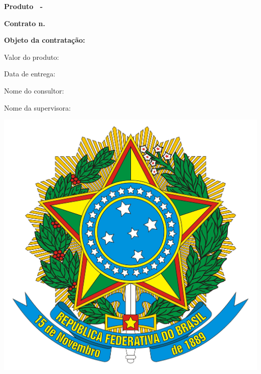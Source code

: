\addtolength{\topmargin}{2.5cm}
\thispagestyle{empty}
{\color{MidnightBlue}

{\bf \LARGE Produto \ProductNumber\ -\ \ProductTitle}

\hrulefill

\vspace{1cm}

\begin{center}

{\bf \large Contrato n. \ContractNumber}

\vspace{1.5cm}

{\bf \large Objeto da contratação: \ObjetoContratacao}

\end{center}

\vspace{3.2cm}

Valor do produto: \ProductValue

\vspace{1.2cm}

Data de entrega: \DataEntrega

\vspace{1.2cm}

Nome do consultor: \MyName

\vspace{1.2cm}

Nome da supervisora: \SupervisorName

}

\vspace{2cm}

\begin{center}
\includegraphics[scale=0.04]{brasao.png} \\
{\bf \small \NomeSecretaria}
\end{center}

\restoregeometry
\newpage
